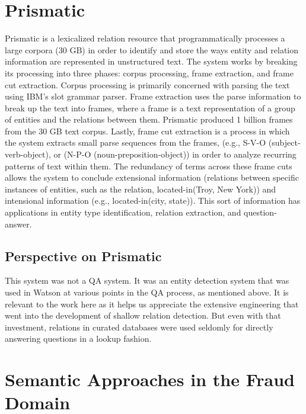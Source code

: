 \section{Prismatic}

Prismatic \cite{fan2012automatic} is a lexicalized relation resource that programmatically processes a large corpora (30 GB) in order to identify and store the ways entity and relation information are represented in unstructured text.  The system works by breaking its processing into
three phases:  corpus processing, frame extraction, and frame cut extraction.  Corpus processing is primarily concerned with parsing the text using IBM's slot grammar parser.  Frame extraction uses the parse information to break up the text into frames, where a frame is a text representation of a group of entities and the relations between them.  Prismatic produced 1 billion frames from the 30 GB text corpus.  Lastly, frame cut extraction is a process in which the system extracts small parse sequences from the frames, (e.g., S-V-O (subject-verb-object), or
(N-P-O (noun-preposition-object)) in order to analyze recurring patterns of text within them.  The redundancy of terms across these frame cuts allows the system to conclude extensional information (relations between specific instances of entities, such as the relation, located-in(Troy, New York)) and intensional information (e.g., located-in(city, state)).  This sort of information has applications in entity type identification, relation extraction, and question-answer.

\subsection{Perspective on Prismatic}

This system was not a QA system.  It was an entity detection system that was used in Watson at various points in the QA process, as mentioned above.  It is relevant to the work here as it helps us appreciate the extensive  engineering that went into the development of shallow relation detection.  But even with that investment, relations in curated databases were used seldomly for directly answering questions in a lookup fashion.


\section{Semantic Approaches in the Fraud Domain}

